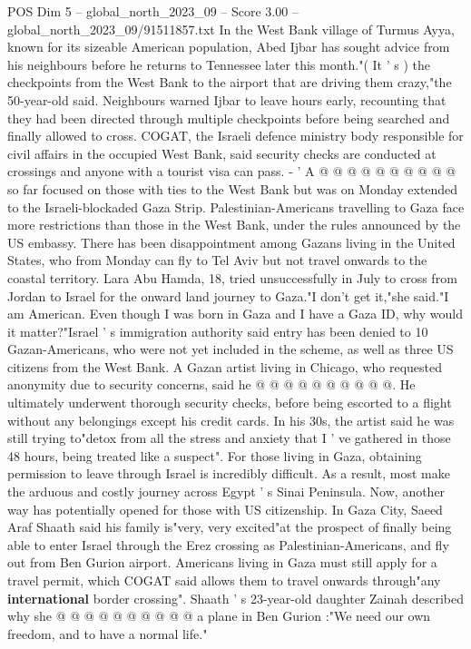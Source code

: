 \begin{textsample}{POS Dim 5 – global\_north\_2023\_09 – Score 3.00 – global\_north\_2023\_09/91511857.txt}
In the West Bank village of Turmus Ayya, known for its sizeable American population, Abed Ijbar has sought advice from his neighbours before he returns to Tennessee later this month."( It ' s ) the checkpoints from the West Bank to the airport that are driving them crazy,"the 50-year-old said.
Neighbours warned Ijbar to leave hours early, recounting that they had been directed through multiple checkpoints before being searched and finally allowed to cross.
COGAT, the Israeli defence ministry body responsible for civil affairs in the occupied West Bank, said security checks are conducted at crossings and anyone with a tourist visa can pass. - ' A @ @ @ @ @ @ @ @ @ @ so far focused on those with ties to the West Bank but was on Monday extended to the Israeli-blockaded Gaza Strip.
Palestinian-Americans travelling to Gaza face more restrictions than those in the West Bank, under the rules announced by the US embassy.
There has been disappointment among Gazans living in the United States, who from Monday can fly to Tel Aviv but not travel onwards to the coastal territory.
Lara Abu Hamda, 18, tried unsuccessfully in July to cross from Jordan to Israel for the onward land journey to Gaza."I don't get it,"she said."I am American.
Even though I was born in Gaza and I have a Gaza ID, why would it matter?"Israel ' s immigration authority said entry has been denied to 10 Gazan-Americans, who were not yet included in the scheme, as well as three US citizens from the West Bank.
A Gazan artist living in Chicago, who requested anonymity due to security concerns, said he @ @ @ @ @ @ @ @ @ @.
He ultimately underwent thorough security checks, before being escorted to a flight without any belongings except his credit cards.
In his 30s, the artist said he was still trying to"detox from all the stress and anxiety that I ' ve gathered in those 48 hours, being treated like a suspect".
For those living in Gaza, obtaining permission to leave through Israel is incredibly difficult.
As a result, most make the arduous and costly journey across Egypt ' s Sinai Peninsula.
Now, another way has potentially opened for those with US citizenship.
In Gaza City, Saeed Araf Shaath said his family is"very, very excited"at the prospect of finally being able to enter Israel through the Erez crossing as Palestinian-Americans, and fly out from Ben Gurion airport.
Americans living in Gaza must still apply for a travel permit, which COGAT said allows them to travel onwards through"any \textbf{international} border crossing".
Shaath ' s 23-year-old daughter Zainah described why she @ @ @ @ @ @ @ @ @ @ a plane in Ben Gurion :"We need our own freedom, and to have a normal life."

\end{textsample}
